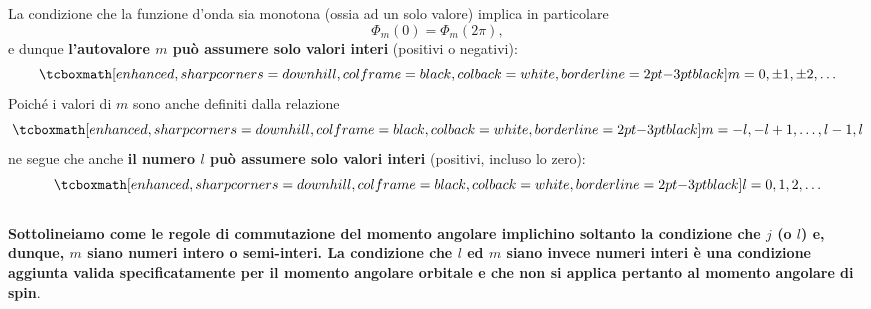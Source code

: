 La condizione che la funzione d'onda sia monotona (ossia ad un solo valore) implica in particolare
	\begin{equation}
		\Phi _m (0) =\Phi _m (2\pi ) ,
	\label{eq:cap17_10}
	\end{equation}
e dunque \textbf{l'autovalore $m$ può assumere solo valori interi} (positivi o negativi):
	\begin{equation}
		\tcboxmath[enhanced, sharp corners=downhill, colframe=black, colback=white, borderline={2pt}{-3pt}{black}]{
			m= 0, \pm 1,\pm 2, \dots
			}
	\end{equation}
Poiché i valori di $m$ sono anche definiti dalla relazione
	\begin{equation}
		\tcboxmath[enhanced, sharp corners=downhill, colframe=black, colback=white, borderline={2pt}{-3pt}{black}]{
			m = -l, -l+1,\dots, l-1,l
			}
	\end{equation}
ne segue che anche \textbf{il numero $l$ può assumere solo valori interi} (positivi, incluso lo zero):
	\begin{equation}
		\tcboxmath[enhanced, sharp corners=downhill, colframe=black, colback=white, borderline={2pt}{-3pt}{black}]{
			l= 0,1,2,\dots
			}
	\end{equation}\\
	
\textbf{Sottolineiamo come le regole di commutazione del momento angolare implichino soltanto la condizione che $j$ (o $l$) e, dunque, $m$  siano numeri intero o semi-interi. La condizione che $l$ ed $m$ siano invece numeri interi è una condizione aggiunta valida specificatamente per il momento angolare orbitale e che non si applica pertanto al momento angolare di spin}.\\

